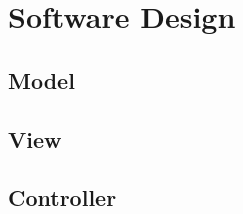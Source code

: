 \section{Software Design}

 \subsection{Model}
  \label{subsection:model}
 \subsection{View}
 \subsection{Controller}